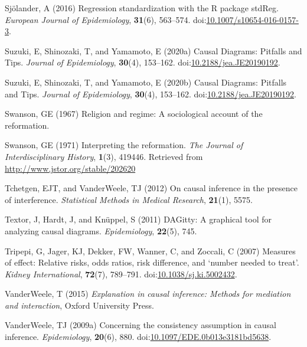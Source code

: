 \documentclass[
  singlecolumn,
  9pt]{article}
\begin{document}
\begin{CSLReferences}
Sjölander, A (2016) Regression standardization with the R package
stdReg. \emph{European Journal of Epidemiology}, \textbf{31}(6),
563--574.
doi:\href{https://doi.org/10.1007/s10654-016-0157-3}{10.1007/s10654-016-0157-3}.

Suzuki, E, Shinozaki, T, and Yamamoto, E (2020a) Causal Diagrams:
Pitfalls and Tips. \emph{Journal of Epidemiology}, \textbf{30}(4),
153--162.
doi:\href{https://doi.org/10.2188/jea.JE20190192}{10.2188/jea.JE20190192}.

Suzuki, E, Shinozaki, T, and Yamamoto, E (2020b) Causal Diagrams:
Pitfalls and Tips. \emph{Journal of Epidemiology}, \textbf{30}(4),
153--162.
doi:\href{https://doi.org/10.2188/jea.JE20190192}{10.2188/jea.JE20190192}.

Swanson, GE (1967) Religion and regime: A sociological account of the
reformation.

Swanson, GE (1971) Interpreting the reformation. \emph{The Journal of
Interdisciplinary History}, \textbf{1}(3), 419446. Retrieved from
\url{http://www.jstor.org/stable/202620}

Tchetgen, EJT, and VanderWeele, TJ (2012) On causal inference in the
presence of interference. \emph{Statistical Methods in Medical
Research}, \textbf{21}(1), 5575.

Textor, J, Hardt, J, and Knüppel, S (2011) DAGitty: A graphical tool for
analyzing causal diagrams. \emph{Epidemiology}, \textbf{22}(5), 745.

Tripepi, G, Jager, KJ, Dekker, FW, Wanner, C, and Zoccali, C (2007)
Measures of effect: Relative risks, odds ratios, risk difference, and
{`}number needed to treat{'}. \emph{Kidney International},
\textbf{72}(7), 789--791.
doi:\href{https://doi.org/10.1038/sj.ki.5002432}{10.1038/sj.ki.5002432}.

VanderWeele, T (2015) \emph{Explanation in causal inference: Methods for
mediation and interaction}, Oxford University Press.

VanderWeele, TJ (2009a) Concerning the consistency assumption in causal
inference. \emph{Epidemiology}, \textbf{20}(6), 880.
doi:\href{https://doi.org/10.1097/EDE.0b013e3181bd5638}{10.1097/EDE.0b013e3181bd5638}.


\end{CSLReferences}
\end{document}
